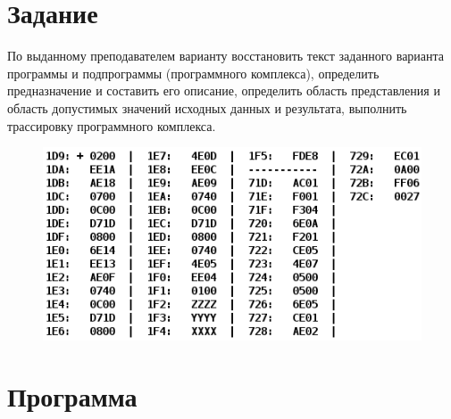 \usepackage{booktabs}%


\section{Задание}
По выданному преподавателем варианту восстановить текст заданного варианта программы и подпрограммы
(программного комплекса), определить предназначение и составить его описание, определить область представления и область
допустимых значений исходных данных и результата, выполнить трассировку программного комплекса.


\begin{figure}[H]
    \centering
    \includegraphics[scale=0.6]{img/variant}
\end{figure}


\section{Программа}

